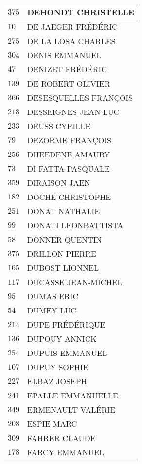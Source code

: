 \begin{xltabular}{\linewidth}{|l|X|}
    \hline
    $375$ & DEHONDT CHRISTELLE \\
    \hline
    $10$ & DE JAEGER FRÉDÉRIC \\
    \hline
    $275$ & DE LA LOSA CHARLES \\
    \hline
    $304$ & DENIS EMMANUEL \\
    \hline
    $47$ & DENIZET FRÉDÉRIC \\
    \hline
    $139$ & DE ROBERT OLIVIER \\
    \hline
    $366$ & DESESQUELLES FRANÇOIS \\
    \hline
    $218$ & DESSEIGNES JEAN-LUC \\
    \hline
    $233$ & DEUSS CYRILLE \\
    \hline
    $79$ & DEZORME FRANÇOIS \\
    \hline
    $256$ & DHEEDENE AMAURY \\
    \hline
    $73$ & DI FATTA PASQUALE \\
    \hline
    $359$ & DIRAISON JAEN \\
    \hline
    $182$ & DOCHE CHRISTOPHE \\
    \hline
    $251$ & DONAT NATHALIE \\
    \hline
    $99$ & DONATI LEONBATTISTA \\
    \hline
    $58$ & DONNER QUENTIN \\
    \hline
    $375$ & DRILLON PIERRE \\
    \hline
    $165$ & DUBOST LIONNEL \\
    \hline
    $117$ & DUCASSE JEAN-MICHEL \\
    \hline
    $95$ & DUMAS ERIC \\
    \hline
    $54$ & DUMEY LUC \\
    \hline
    $214$ & DUPE FRÉDÉRIQUE \\
    \hline
    $136$ & DUPOUY ANNICK \\
    \hline
    $254$ & DUPUIS EMMANUEL \\
    \hline
    $107$ & DUPUY SOPHIE \\
    \hline
    $227$ & ELBAZ JOSEPH \\
    \hline
    $241$ & EPALLE EMMANUELLE \\
    \hline
    $349$ & ERMENAULT VALÉRIE \\
    \hline
    $208$ & ESPIE MARC \\
    \hline
    $309$ & FAHRER CLAUDE \\
    \hline
    $178$ & FARCY EMMANUEL \\

\end{xltabular}
